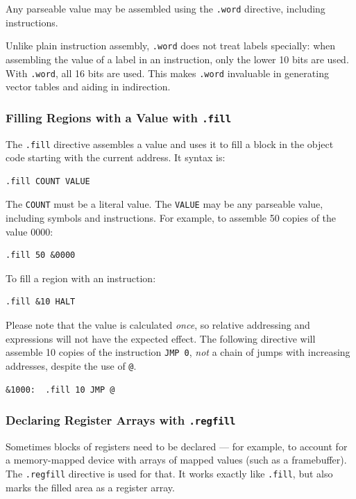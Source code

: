 \documentclass[11pt,a4paper,twocolumns]{article}
\newcommand\op[1]{\texttt{#1}}
\newcommand\f[1]{{\color{black}\texttt{#1}}}
\newcommand\hex[1]{\textsf{#1}}
\begin{document}
Any parseable value may be assembled using the \f{.word} directive, including
instructions.

Unlike plain instruction assembly, \f{.word} does not treat labels specially:
when assembling the value of a label in an instruction, only the lower 10 bits
are used. With \f{.word}, all 16 bits are used. This makes \f{.word} invaluable
in generating vector tables and aiding in indirection.



\subsubsection{Filling Regions with a Value with \f{.fill}}

The \f{.fill} directive assembles a value and uses it to fill a block in the
object code starting with the current address. It syntax is:

\begin{verbatim}
.fill COUNT VALUE
\end{verbatim}

The \op{COUNT} must be a literal value. The \op{VALUE} may be any parseable
value, including symbols and instructions. For example, to assemble 50 copies
of the value \hex{0000}:

\begin{verbatim}
.fill 50 &0000
\end{verbatim}

To fill a region with an instruction:

\begin{verbatim}
.fill &10 HALT
\end{verbatim}

Please note that the value is calculated {\em once}, so relative addressing and
expressions will not have the expected effect. The following directive will
assemble 10 copies of the instruction \op{JMP 0}, {\em not\/} a chain of jumps
with increasing addresses, despite the use of \op{@}.

\begin{verbatim}
&1000:  .fill 10 JMP @
\end{verbatim}



\subsubsection{Declaring Register Arrays with \f{.regfill}}

Sometimes blocks of registers need to be declared — for example, to account for
a memory-mapped device with arrays of mapped values (such as a
framebuffer). The \op{.regfill} directive is used for that. It works exactly
like \op{.fill}, but also marks the filled area as a register array.
\end{document}
